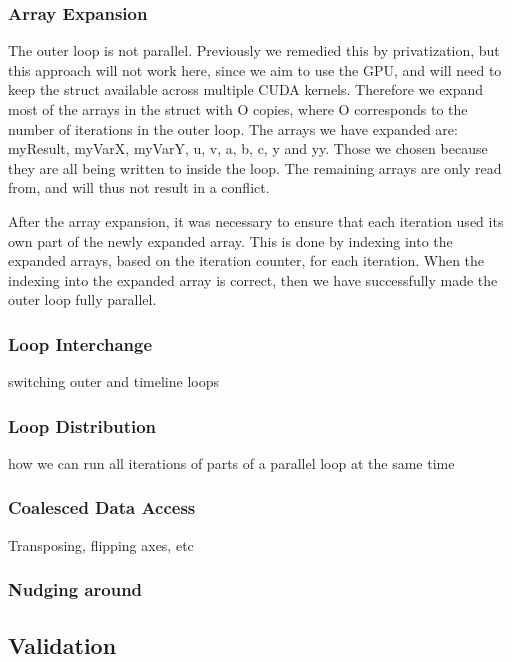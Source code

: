 \documentclass[11pt]{article}
\begin{document}
\subsubsection{Array Expansion}
The outer loop is not parallel. Previously we remedied this by privatization,
but this approach will not work here, since we aim to use the GPU, and will 
need to keep the struct available across multiple CUDA kernels. Therefore we
expand most of the arrays in the struct with O copies, where O corresponds to
the number of iterations in the outer loop. The arrays we have expanded are:
myResult, myVarX, myVarY, u, v, a, b, c, y and yy. Those we chosen because 
they are all being written to inside the loop. The remaining arrays are only 
read from, and will thus not result in a conflict. 

After the array expansion,
it was necessary to ensure that each iteration used its own part of the newly
expanded array. This is done by indexing into the expanded arrays, based on the
iteration counter, for each iteration. When the indexing into the expanded
array is correct, then we have successfully made the outer loop fully parallel.


\subsubsection{Loop Interchange}
switching outer and timeline loops

\subsubsection{Loop Distribution}
how we can run all iterations of parts of a parallel loop at the same time


\subsubsection{Coalesced Data Access}
Transposing, flipping axes, etc

\subsubsection{Nudging around}

\subsection{Validation}
\end{document}
